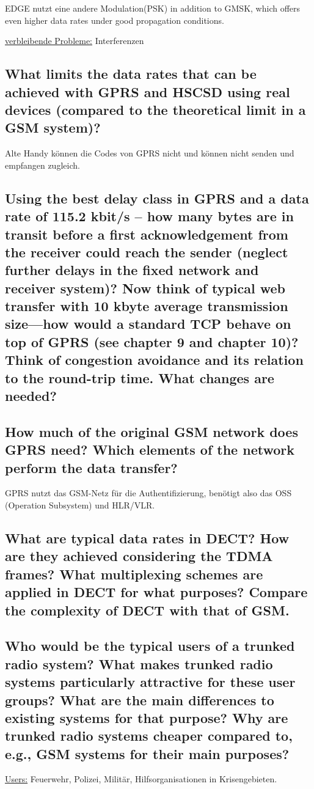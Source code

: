 EDGE nutzt eine andere Modulation(PSK) in addition to GMSK, which offers even higher data rates under good propagation conditions.

\underline{verbleibende Probleme:} Interferenzen 


\subsection{What limits the data rates that can be achieved with GPRS and HSCSD using real devices (compared to the theoretical limit in a GSM system)?}
Alte Handy können die Codes von GPRS nicht und können nicht senden und empfangen zugleich.

\subsection{Using the best delay class in GPRS and a data rate of 115.2 kbit/s – how many bytes are in transit before a first acknowledgement from the receiver could reach the sender (neglect further delays in the fixed network and receiver system)? Now think of typical web transfer with 10 kbyte average transmission size—how would a standard TCP behave on top of GPRS (see chapter 9 and chapter 10)? Think of congestion avoidance and its relation to the round-trip time. What changes are needed?}

\subsection{How much of the original GSM network does GPRS need? Which elements of the network perform the data transfer?}
GPRS nutzt das GSM-Netz für die Authentifizierung, benötigt also das OSS (Operation Subsystem) und HLR/VLR.

\subsection{What are typical data rates in DECT? How are they achieved considering the TDMA frames? What multiplexing schemes are applied in DECT for what purposes? Compare the complexity of DECT with that of GSM.}

\subsection{Who would be the typical users of a trunked radio system? What makes trunked radio systems particularly attractive for these user groups? What are the main differences to existing systems for that purpose? Why are trunked radio systems cheaper compared to, e.g., GSM systems for their main purposes?}
\underline{Users:} Feuerwehr, Polizei, Militär, Hilfsorganisationen in Krisengebieten.

